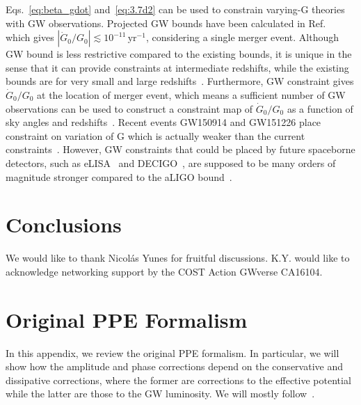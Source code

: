 \documentclass[prd,twocolumn,nofootinbib]{revtex4-1}
\begin{document}
Eqs.~\eqref{eq:beta_gdot} and~\eqref{eq:3.7d2} can be used to constrain varying-G theories with GW observations. Projected GW bounds have been calculated in Ref.~\cite{Yunes:2009bv} which gives $|\dot{G}_0/G_0| \lesssim 10^{-11}\, \mathrm{yr}^{-1}$, considering a single merger event. Although GW bound is less restrictive compared to the existing bounds, it is unique in the sense that it can provide constraints at intermediate redshifts, while the existing bounds are for very small and large redshifts~\cite{Yunes:2009bv}. Furthermore, GW constraint gives $\dot{G}_0/G_0$ at the location of merger event, which means a sufficient number of GW observations can be used to construct a constraint map of $\dot{G}_0/G_0$ as a function of sky angles and redshifts~\cite{Yunes:2009bv}. Recent events GW150914 and GW151226 place constraint on variation of G which is actually weaker than the current constraints~\cite{Yunes:2016jcc}. However, GW constraints that could be placed by future spaceborne detectors, such as eLISA~\cite{Seoane:2013qna} and DECIGO~\cite{PhysRevLett.87.221103}, are supposed to be many orders of magnitude stronger compared to the aLIGO bound~\cite{Yunes:2009bv}.
 



\section{Conclusions}
\label{sec:conclusions}

\acknowledgments
We would like to thank Nicol\' as Yunes for fruitful discussions.
K.Y. would like to acknowledge networking support by the COST Action GWverse CA16104.

 \appendix 
 
 \section{Original PPE Formalism}
 \label{appendix}

In this appendix, we review the original PPE formalism. In particular, we will show how the amplitude and phase corrections depend on the conservative and dissipative corrections, where the former are corrections to the effective potential while the latter are those to the GW luminosity. We will mostly follow~\cite{Chatziioannou:2012rf}.
\end{document}
